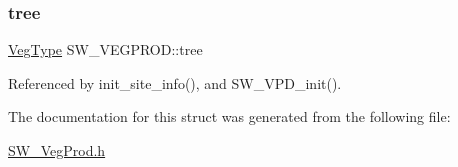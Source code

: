 \subsubsection{\texorpdfstring{tree}{tree}}
{\footnotesize\ttfamily \hyperlink{struct_veg_type}{Veg\+Type} S\+W\+\_\+\+V\+E\+G\+P\+R\+O\+D\+::tree}



Referenced by init\+\_\+site\+\_\+info(), and S\+W\+\_\+\+V\+P\+D\+\_\+init().



The documentation for this struct was generated from the following file\+:\begin{DoxyCompactItemize}
\item 
\hyperlink{_s_w___veg_prod_8h}{S\+W\+\_\+\+Veg\+Prod.\+h}\end{DoxyCompactItemize}
